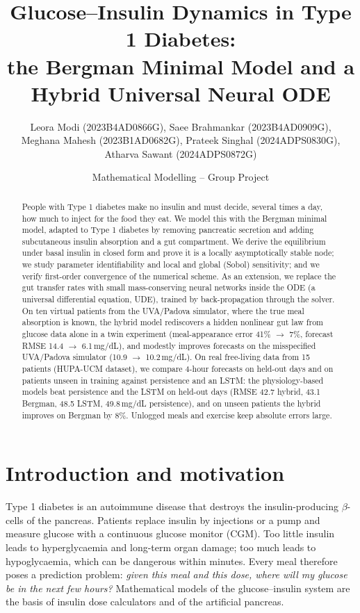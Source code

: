 \documentclass[11pt,a4paper]{article}
\title{\textbf{Glucose--Insulin Dynamics in Type 1 Diabetes:\\ the Bergman Minimal Model and a Hybrid Universal Neural ODE}}
\author{Leora Modi (2023B4AD0866G), Saee Brahmankar (2023B4AD0909G), \\Meghana Mahesh (2023B1AD0682G), Prateek Singhal (2024ADPS0830G), \\Atharva Sawant (2024ADPS0872G)}
\date{Mathematical Modelling -- Group Project}
\begin{document}
\maketitle

\begin{abstract}
People with Type 1 diabetes make no insulin and must decide, several times a day, how much to inject for the food they eat. We model this with the Bergman minimal model, adapted to Type 1 diabetes by removing pancreatic secretion and adding subcutaneous insulin absorption and a gut compartment. We derive the equilibrium under basal insulin in closed form and prove it is a locally asymptotically stable node; we study parameter identifiability and local and global (Sobol) sensitivity; and we verify first-order convergence of the numerical scheme. As an extension, we replace the gut transfer rates with small mass-conserving neural networks inside the ODE (a universal differential equation, UDE), trained by back-propagation through the solver. On ten virtual patients from the UVA/Padova simulator, where the true meal absorption is known, the hybrid model rediscovers a hidden nonlinear gut law from glucose data alone in a twin experiment (meal-appearance error 41\% $\to$ 7\%, forecast RMSE 14.4 $\to$ 6.1\,mg/dL), and modestly improves forecasts on the misspecified UVA/Padova simulator (10.9 $\to$ 10.2\,mg/dL). On real free-living data from 15 patients (HUPA-UCM dataset), we compare 4-hour forecasts on held-out days and on patients unseen in training against persistence and an LSTM: the physiology-based models beat persistence and the LSTM on held-out days (RMSE 42.7 hybrid, 43.1 Bergman, 48.5 LSTM, 49.8\,mg/dL persistence), and on unseen patients the hybrid improves on Bergman by 8\%. Unlogged meals and exercise keep absolute errors large.
\end{abstract}

\section{Introduction and motivation}
Type 1 diabetes is an autoimmune disease that destroys the insulin-producing $\beta$-cells of the pancreas. Patients replace insulin by injections or a pump and measure glucose with a continuous glucose monitor (CGM). Too little insulin leads to hyperglycaemia and long-term organ damage; too much leads to hypoglycaemia, which can be dangerous within minutes. Every meal therefore poses a prediction problem: \emph{given this meal and this dose, where will my glucose be in the next few hours?} Mathematical models of the glucose--insulin system are the basis of insulin dose calculators and of the artificial pancreas.
\end{document}
